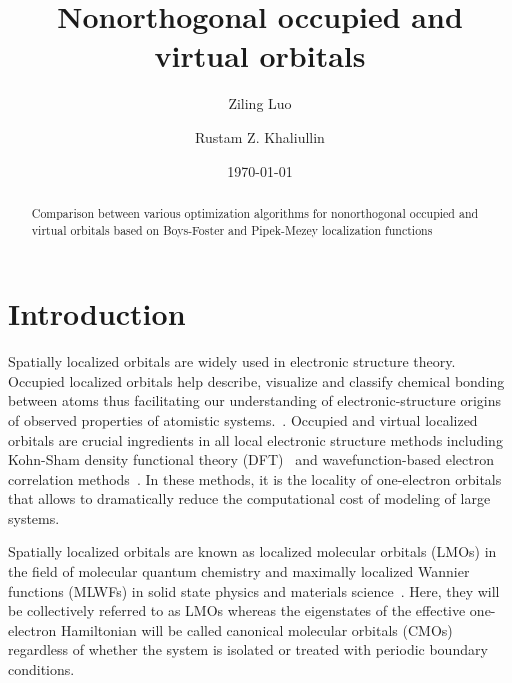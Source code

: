 \documentclass[aps,prl,reprint,amsmath,amssymb]{revtex4-1}
\begin{document}
\nocite{achemso-ctrl}



\title{
Nonorthogonal  occupied and virtual orbitals
}

\author{Ziling Luo}
\author{Rustam Z. Khaliullin}

\date{\today}

\begin{abstract}
Comparison between various optimization algorithms for nonorthogonal  occupied and virtual orbitals based on Boys-Foster and Pipek-Mezey localization functions
\end{abstract}


\maketitle

\section{Introduction} 
Spatially localized orbitals are widely used in electronic structure theory.
Occupied localized orbitals help describe, visualize and classify chemical bonding between atoms thus facilitating our understanding of electronic-structure origins of observed properties of atomistic systems.~\cite{boys1960construction, edmiston1963localized, pipek1989fast, niessen1972density, weinhold2012natural}.
Occupied and virtual localized orbitals are crucial ingredients in all local electronic structure methods including Kohn-Sham density functional theory (DFT)~\cite{goedecker1994efficient, bowler2012methods, zalesny2011linear, pulay1986orbital, saebo2001low, pisani2005local, hampel1996local, forner1997numerical} and wavefunction-based electron correlation methods~\cite{saebo1993local, schutz1999low, hetzer2000low, schutz2001low}.
In these methods, it is the locality of one-electron orbitals that allows to dramatically reduce the computational cost of modeling of large systems.

Spatially localized orbitals are known as localized molecular orbitals (LMOs) in the field of molecular quantum chemistry and maximally localized Wannier functions (MLWFs) in solid state physics and materials science~\cite{marzari2012maximally}.
Here, they will be collectively referred to as LMOs whereas the eigenstates of the effective one-electron Hamiltonian will be called canonical molecular orbitals (CMOs) regardless of whether the system is isolated or treated with periodic boundary conditions.
\end{document}
